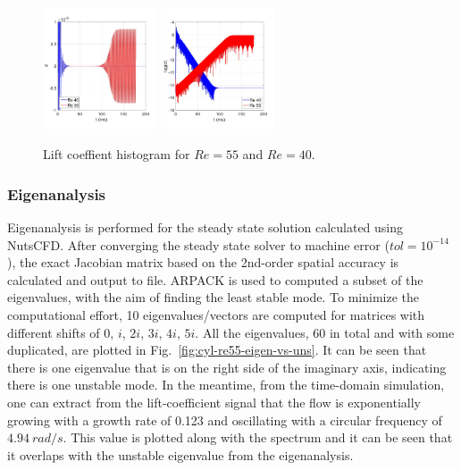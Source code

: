 \documentclass[journal,final]{new-aiaa}
\begin{document}
\begin{figure}[htb]
	\centering   
	\includegraphics[width=0.3\textwidth]{pic/cl-linear.jpg}	
	\includegraphics[width=0.3\textwidth]{pic/cl-log.jpg}
	\caption{Lift coeffient histogram for $Re=55$ and $Re=40$.}
	\label{fig:cyl-re40-re55-uns}
\end{figure}

\subsubsection{Eigenanalysis}
Eigenanalysis is performed for the steady state solution calculated
using NutsCFD. After converging the steady state solver to machine error ($tol=10^{-14}$),
the exact Jacobian matrix based on the 2nd-order spatial accuracy is calculated and
output to file. ARPACK is used to computed a subset of the eigenvalues, with the aim of
finding the least stable mode.
To minimize the computational effort, 10 eigenvalues/vectors
are computed for matrices with different shifts of $0$, $i$, $2i$, $3i$, $4i$, $5i$. All the
eigenvalues, 60 in total and with some duplicated, are plotted
in Fig.~\ref{fig:cyl-re55-eigen-vs-uns}.
It can be seen that there is one eigenvalue that is on the right side of the imaginary axis,
indicating there is one unstable mode. In the meantime, from the time-domain simulation,
one can extract from the lift-coefficient signal that the flow is exponentially growing with
a growth rate of 0.123 and oscillating with a circular frequency of $4.94~rad/s$. This
value is plotted along with the spectrum and it can be seen that it overlaps with the
unstable eigenvalue from the eigenanalysis. 
\end{document}
